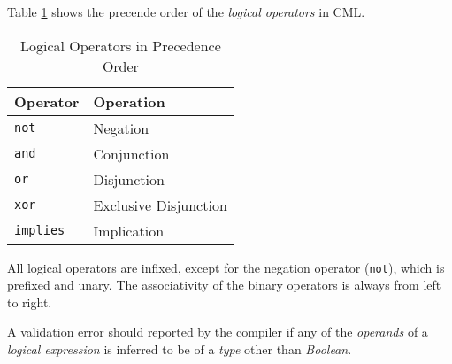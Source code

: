 Table \ref{tab:logical-expr-constraints} shows
the precende order of the \emph{logical operators} in CML.

\begin{table}[H]
\centering
\begin{tabular}
{ l l }
\hline
Operator & Operation \\
\hline
\verb!not! & Negation \\
\verb!and! & Conjunction \\
\verb!or! & Disjunction \\
\verb!xor! & Exclusive Disjunction \\
\verb!implies! & Implication \\
\end{tabular}
\caption{Logical Operators in Precedence Order}
\label{tab:logical-expr-constraints}
\end{table}

All logical operators are infixed,
except for the negation operator (\verb|not|),
which is prefixed and unary.
The associativity of the binary operators is always from left to right.

A validation error should reported by the compiler if any of the \emph{operands}
of a \emph{logical expression} is inferred to be of a \emph{type}
other than \emph{Boolean}.
